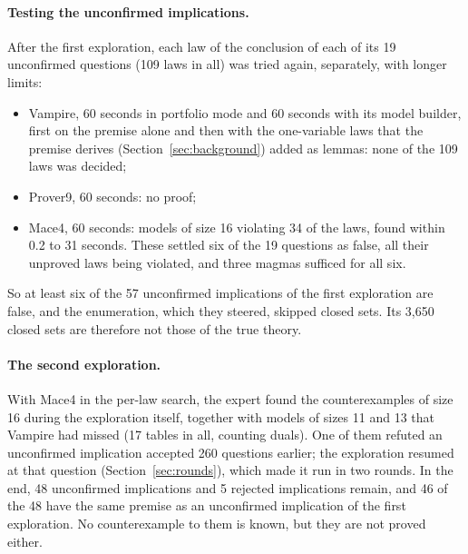\documentclass[11pt,a4paper]{article}
\theoremstyle{definition}
\theoremstyle{remark}
\begin{document}
\paragraph{Testing the unconfirmed implications.}
After the first exploration, each law of the conclusion of each of its 19 unconfirmed questions (109 laws in all) was tried again, separately, with longer limits:
\begin{itemize}
  \item Vampire, 60 seconds in portfolio mode and 60 seconds with its model builder, first on the premise alone and then with the one-variable laws that the premise derives (Section~\ref{sec:background}) added as lemmas: none of the 109 laws was decided;
  \item Prover9, 60 seconds: no proof;
  \item Mace4, 60 seconds: models of size 16 violating 34 of the laws, found within 0.2 to 31 seconds. These settled six of the 19 questions as false, all their unproved laws being violated, and three magmas sufficed for all six.
\end{itemize}
So at least six of the 57 unconfirmed implications of the first exploration are false, and the enumeration, which they steered, skipped closed sets. Its 3,650 closed sets are therefore not those of the true theory.

\paragraph{The second exploration.}
With Mace4 in the per-law search, the expert found the counterexamples of size 16 during the exploration itself, together with models of sizes 11 and 13 that Vampire had missed (17 tables in all, counting duals). One of them refuted an unconfirmed implication accepted 260 questions earlier; the exploration resumed at that question (Section~\ref{sec:rounds}), which made it run in two rounds. In the end, 48 unconfirmed implications and 5 rejected implications remain, and 46 of the 48 have the same premise as an unconfirmed implication of the first exploration. No counterexample to them is known, but they are not proved either.
\end{document}

